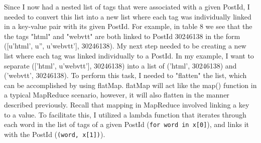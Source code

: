 \documentclass[]{article}
\newcommand{\code}[1]{\colorbox{light-gray}{\texttt{#1}}}
\begin{document}
Since I now had a nested list of tags that were associated with a given PostId, I needed to convert this list into a new list where each tag was individually linked in a key-value pair with its given PostId.  For example, in table 8 we see that the the tags "html" and "webvtt" are both linked to PostId 30246138 in the form ([u'html', u'', u'webvtt'], 30246138).  My next step needed to be creating a new list where each tag was linked individually to a PostId.  In my example, I want to separate (['html', u'webvtt'], 30246138) into a list of ('html', 30246138) and ('webvtt', 30246138).  To perform this task, I needed to "flatten" the list, which can be accomplished by using flatMap.  flatMap will act like the map() function in a typical MapReduce scenario, however, it will also flatten in the manner described previously.  Recall that mapping in MapReduce involved linking a key to a value.  To facilitate this, I utilized a lambda function that iterates through each word in the list of tags of a given PostId (\code{for word in x[0]}), and links it with the PostId (\code{(word, x[1])}).
\end{document}
